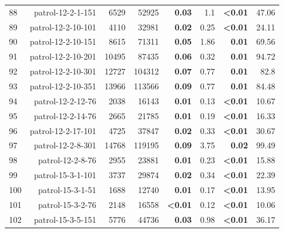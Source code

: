 \begin{longtable}{lrr@{\hskip 12pt}r@{\hskip 12pt}r@{\hskip 12pt}r@{\hskip 12pt}r@{\hskip 12pt}r}
88 & \multirow{1}{*}{patrol-12-2-1-151} & \multirow{1}{*}{6529} & \multirow{1}{*}{52925} & \textbf{0.03} & 1.1 & \textbf{<0.01} & 47.06 \\
89 & \multirow{1}{*}{patrol-12-2-10-101} & \multirow{1}{*}{4110} & \multirow{1}{*}{32981} & \textbf{0.02} & 0.25 & \textbf{<0.01} & 24.11 \\
90 & \multirow{1}{*}{patrol-12-2-10-151} & \multirow{1}{*}{8615} & \multirow{1}{*}{71311} & \textbf{0.05} & 1.86 & \textbf{0.01} & 69.56 \\
91 & \multirow{1}{*}{patrol-12-2-10-201} & \multirow{1}{*}{10495} & \multirow{1}{*}{87435} & \textbf{0.06} & 0.32 & \textbf{0.01} & 94.72 \\
92 & \multirow{1}{*}{patrol-12-2-10-301} & \multirow{1}{*}{12727} & \multirow{1}{*}{104312} & \textbf{0.07} & 0.77 & \textbf{0.01} & 82.8 \\
93 & \multirow{1}{*}{patrol-12-2-10-351} & \multirow{1}{*}{13966} & \multirow{1}{*}{113566} & \textbf{0.09} & 0.77 & \textbf{0.01} & 84.48 \\
94 & \multirow{1}{*}{patrol-12-2-12-76} & \multirow{1}{*}{2038} & \multirow{1}{*}{16143} & \textbf{0.01} & 0.13 & \textbf{<0.01} & 10.67 \\
95 & \multirow{1}{*}{patrol-12-2-14-76} & \multirow{1}{*}{2665} & \multirow{1}{*}{21785} & \textbf{0.01} & 0.19 & \textbf{<0.01} & 16.33 \\
96 & \multirow{1}{*}{patrol-12-2-17-101} & \multirow{1}{*}{4725} & \multirow{1}{*}{37847} & \textbf{0.02} & 0.33 & \textbf{<0.01} & 30.67 \\
97 & \multirow{1}{*}{patrol-12-2-8-301} & \multirow{1}{*}{14768} & \multirow{1}{*}{119195} & \textbf{0.09} & 3.75 & \textbf{0.02} & 99.49 \\
98 & \multirow{1}{*}{patrol-12-2-8-76} & \multirow{1}{*}{2955} & \multirow{1}{*}{23881} & \textbf{0.01} & 0.23 & \textbf{<0.01} & 15.88 \\
99 & \multirow{1}{*}{patrol-15-3-1-101} & \multirow{1}{*}{3737} & \multirow{1}{*}{29874} & \textbf{0.02} & 0.34 & \textbf{<0.01} & 22.39 \\
100 & \multirow{1}{*}{patrol-15-3-1-51} & \multirow{1}{*}{1688} & \multirow{1}{*}{12740} & \textbf{0.01} & 0.17 & \textbf{<0.01} & 13.95 \\
101 & \multirow{1}{*}{patrol-15-3-2-76} & \multirow{1}{*}{2148} & \multirow{1}{*}{16558} & \textbf{<0.01} & 0.12 & \textbf{<0.01} & 10.06 \\
102 & \multirow{1}{*}{patrol-15-3-5-151} & \multirow{1}{*}{5776} & \multirow{1}{*}{44736} & \textbf{0.03} & 0.98 & \textbf{<0.01} & 36.17 \\

\end{longtable}
